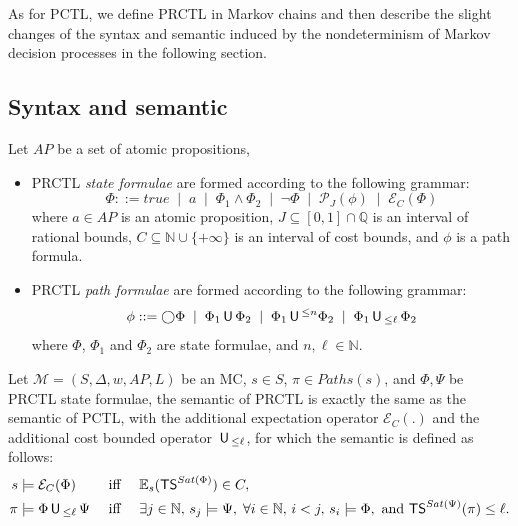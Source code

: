 As for PCTL, we define PRCTL in Markov chains and then describe the slight changes of the syntax and semantic induced by the nondeterminism of Markov decision processes in the following section.

\subsection*{Syntax and semantic}

\begin{definition}
Let $AP$ be a set of atomic propositions,
\begin{itemize}
  \item PRCTL \textit{state formulae} are formed according to the following grammar:
  \[
    \Phi ::= true \;\; | \;\; a \;\; | \;\; \Phi_1 \wedge \Phi_2 \;\; | \;\; \neg \Phi \;\; | \;\; \mathcal{P}_J(\phi) \;\; | \;\; \mathcal{E}_C(\Phi)
  \]
  where $a \in AP$ is an atomic proposition, $J \subseteq [0, 1] \cap \mathbb{Q}$ is an interval of rational bounds, $C \subseteq \mathbb{N} \cup \{+\infty\}$ is an interval of cost bounds, and $\phi$ is a path formula.
  \item PRCTL \textit{path formulae} are formed according to the following grammar:
  \[
  \phi ::= \bigcirc \Phi \;\; | \;\; \Phi_1 \,\text{\sffamily U}\, \Phi_2 \;\; | \;\; \Phi_1 \,\text{\sffamily U}\,^{\leq n} \Phi_2
  \;\; | \;\; \Phi_1 \,\text{\sffamily U}\,_{\leq \ell}\, \Phi_2
  \]
  where $\Phi$, $\Phi_1$ and $\Phi_2$ are state formulae, and $n, \ell \in \mathbb{N}$.
\end{itemize}
\end{definition}
\begin{definition}
  Let $\mathcal{M} = (S, \Delta, w, AP, L)$ be an MC, $s \in S$, $\pi \in Paths(s)$, and $\Phi, \Psi$ be PRCTL state formulae, the semantic of PRCTL is exactly the same as the semantic of PCTL, with the additional expectation operator $\mathcal{E}_C(.)$ and the additional cost bounded operator $\,\text{\sffamily U}\,_{\leq \ell}$, for which the semantic is defined as follows:
  \begin{align*}
  s &\models \mathcal{E}_C(\Phi) &\text{ iff }\quad& \mathbb{E}_s(\text{\sffamily TS}^{Sat(\Phi)}) \in C,\\
  \pi &\models \Phi \,\text{\sffamily U}\,_{\leq \ell}\, \Psi &\text{ iff }\quad&
  \exists j \in \mathbb{N}, \, s_j \models \Psi, \; \forall i \in \mathbb{N}, \, i<j, \, s_i \models \Phi,
  \text{ and } \text{\sffamily TS}^{Sat(\Psi)}(\pi) \leq \ell.
  \end{align*}
\end{definition}

